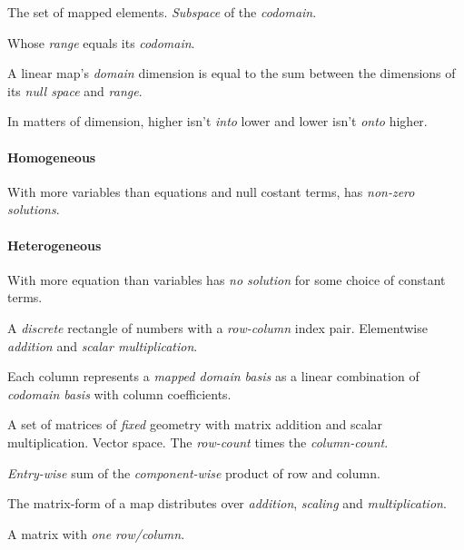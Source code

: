 \begin{multicols}{3}
  The set of mapped elements.
  \textit{Subspace} of the \textit{codomain}.

  Whose \textit{range} equals its \textit{codomain}.

  A linear map's \textit{domain} dimension is equal to the sum between the dimensions of its \textit{null space} and \textit{range}.

  In matters of dimension, higher isn't \textit{into} lower and lower isn't \textit{onto} higher.

  \paragraph{\textbf{Homogeneous}}
  With more variables than equations and null costant terms, has \textit{non-zero solutions}.
  
  \paragraph{\textbf{Heterogeneous}}
  With more equation than variables has \textit{no solution} for some choice of constant terms.
  
  A \textit{discrete} rectangle of numbers with a \textit{row-column} index pair.
  Elementwise \textit{addition} and \textit{scalar multiplication}.
  
  Each column represents a \textit{mapped domain basis} as a linear combination of \textit{codomain basis} with column coefficients.

  A set of matrices of \textit{fixed} geometry with matrix addition and scalar multiplication.
  Vector space.
  The \textit{row-count} times the \textit{column-count}.
  
  \textit{Entry-wise} sum of the \textit{component-wise} product of row and column.
  
  The matrix-form of a map distributes over \textit{addition}, \textit{scaling} and \textit{multiplication}.

  A matrix with \textit{one row/column}.


\end{multicols}
